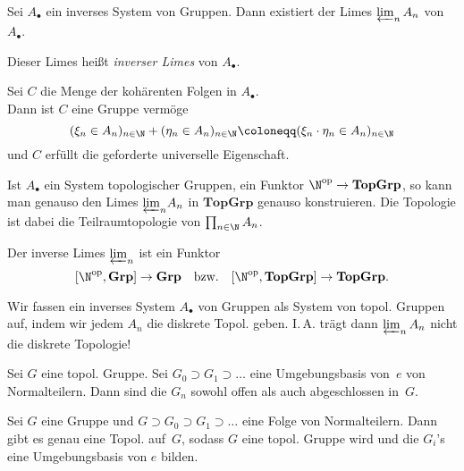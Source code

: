 \documentclass{cheat-sheet}
\newcommand{\Grp}{\mathbf{Grp}} %
\newcommand{\TopGrp}{\mathbf{TopGrp}} %
\newcommand{\op}{\mathrm{op}} %
\begin{document}
\begin{prop}
  Sei $A_\bullet$ ein inverses System von Gruppen.
  Dann existiert der Limes $\varprojlim_{n} A_n$ von $A_\bullet$.
\end{prop}

\begin{defn}
  Dieser Limes heißt \emph{inverser Limes} von $A_\bullet$.
\end{defn}

\begin{konstr}
  Sei $C$ die Menge der kohärenten Folgen in $A_\bullet$. \\
  Dann ist $C$ eine Gruppe vermöge
  \[
    (\xi_n \in A_n)_{n \in \N} + (\eta_n \in A_n)_{n \in \N} \coloneqq (\xi_n \cdot \eta_n \in A_n)_{n \in \N}
  \]
  und $C$ erfüllt die geforderte universelle Eigenschaft.
\end{konstr}

\begin{bem}
  Ist $A_\bullet$ ein System topologischer Gruppen, \dh{} ein Funktor $\N^\op \to \TopGrp$, so kann man genauso den Limes ${\varprojlim}_{n} A_n$ in $\TopGrp$ genauso konstruieren.
  Die Topologie ist dabei die Teilraumtopologie von $\prod_{n \in \N} A_n$.
\end{bem}

\begin{bem}
  Der inverse Limes ${\varprojlim}_n$ ist ein Funktor
  \[
    [\N^\op, \Grp] \to \Grp
    \quad \text{bzw.} \quad
    [\N^\op, \TopGrp] \to \TopGrp.
  \]
\end{bem}

\begin{acht}
  Wir fassen ein inverses System $A_\bullet$ von Gruppen als System von topol. Gruppen auf, indem wir jedem $A_n$ die diskrete Topol. geben.
  I.\,A. trägt dann $\varprojlim_{n} A_n$ nicht die diskrete Topologie!
\end{acht}


\begin{prop}
  Sei $G$ eine topol. Gruppe.
  Sei $G_0 \supset G_1 \supset \ldots$ eine Umgebungsbasis von~$e$ von Normalteilern.
  Dann sind die $G_n$ sowohl offen als auch abgeschlossen in~$G$.
\end{prop}

\begin{bem}
  Sei $G$ eine Gruppe und $G \supset G_0 \supset G_1 \supset \ldots$ eine Folge von Normalteilern.
  Dann gibt es genau eine Topol. auf~$G$, sodass $G$ eine topol. Gruppe wird und die $G_i$'s eine Umgebungsbasis von $e$ bilden.
\end{bem}
\end{document}
